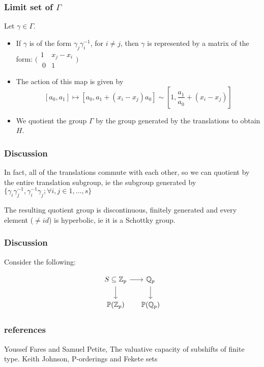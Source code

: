 \documentclass{beamer}
\theoremstyle{definition}
\begin{document}
\begin{frame}
\frametitle{Limit set of $\Gamma$}
Let $\gamma \in \Gamma$.
\begin{itemize}
\item If $\gamma$ is of the form $\gamma_j \gamma_i^{-1}$, for $i \neq j$, then $\gamma$  is represented by a matrix of the form:  $\bigl( \begin{smallmatrix}1 & x_j-x_i\\\ 0 & 1 \end{smallmatrix}\bigr)$
\item The action of this map is given by \[[a_0,a_1] \mapsto [a_0, a_1 + (x_i-x_j)a_0] \sim [1, \frac{a_1}{a_0} + (x_i-x_j) ]\]
\pause
\item We quotient the group $\Gamma$ by the group generated by the translations to obtain $H$.
\end{itemize}
\end{frame}



\begin{frame}
\frametitle{Discussion}
In fact, all of the translations commute with each other, so we can quotient by the entire translation subgroup, ie the subgroup generated by $\{\gamma_i \gamma_j^{-1}, \gamma_i ^{-1} \gamma_j; \forall i,j \in 1,\ldots,s\}$ 
\parskip=20pt
\pause

The resulting quotient group is discontinuous, finitely generated and every element ($\neq id$)  is hyperbolic, ie it is a Schottky group. 

\end{frame}


\begin{frame}
\frametitle{Discussion}
Consider the following:

\[
        \begin{tikzcd}[ampersand replacement=\&, column sep=small]
            S \subseteq \mathbb{Z}_p \arrow[r] \ar[d] \&  \mathbb{Q}_p  \ar[d] \\
            \mathbb{P}(\mathbb{Z}_p)  \&   \mathbb{P}(\mathbb{Q}_p)
        \end{tikzcd}
    \]

\end{frame}



\begin{frame}
\frametitle{references}
\begin{thebibliography}{1}
 Youssef Fares and Samuel Petite, The valuative capacity of subshifts of finite type.
 Keith Johnson, P-orderings and Fekete sets
\end{thebibliography}
\end{frame}
\end{document}
